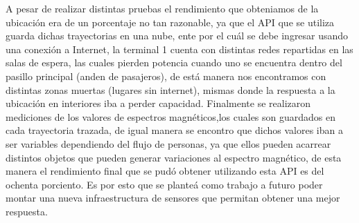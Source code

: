 A pesar de realizar distintas pruebas el rendimiento que obteniamos de la ubicación era de un porcentaje no tan razonable, ya que 
el API que se utiliza guarda dichas trayectorias en una nube, ente por el cuál se debe ingresar usando una conexión a Internet, 
la terminal 1 cuenta con distintas redes repartidas en las salas de espera, las cuales pierden potencia cuando uno se encuentra dentro 
del pasillo principal (anden de pasajeros), de está manera nos encontramos con distintas zonas muertas (lugares sin internet), 
mismas donde la respuesta a la ubicación en interiores iba a perder capacidad. 
Finalmente se realizaron mediciones de los valores de espectros magnéticos,los cuales son guardados en cada trayectoria trazada, 
de igual manera se encontro que dichos valores iban a ser variables dependiendo del flujo de personas, ya que ellos pueden acarrear 
distintos objetos que pueden generar variaciones al espectro magnético, de esta manera el rendimiento final que se pudó obtener utilizando 
esta API es del ochenta porciento. Es por esto que se planteá como trabajo a futuro poder montar una nueva infraestructura de sensores 
que permitan obtener una mejor respuesta.

